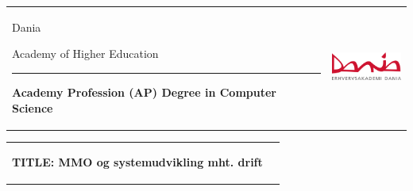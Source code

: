 \thispagestyle{empty}
\begin{titlepage}
\begin{nopagebreak}
{\samepage
\begin{tabular}{lr}
\parbox{14.5cm}{
  {\LARGE Dania}

  {\small Academy of Higher Education}
  \vspace{-0.3cm}\\
\hrule
\vspace{0.2cm}
  {\bf Academy Profession (AP) Degree in Computer Science}
 }   & \hspace{-2.8cm} {  \includegraphics[width=23mm]{pictures/dania}}
\end{tabular}
  

\begin{tabular}{cc}
\parbox{8cm}{
\hspace{2cm}
\begin{description}

\item {\bf TITLE: MMO og systemudvikling mht. drift} 


\end{description}

\parbox{8cm}{

}}
\end{tabular}}
\end{nopagebreak}
\end{titlepage}
